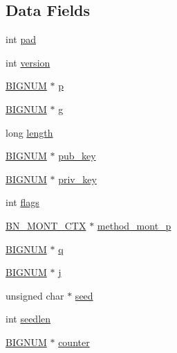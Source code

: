 \subsection*{Data Fields}
\begin{DoxyCompactItemize}
\item 
int \hyperlink{structdh__st_af1d40a330bc745f51d8b079c9dc473ff}{pad}
\item 
int \hyperlink{structdh__st_aad880fc4455c253781e8968f2239d56f}{version}
\item 
\hyperlink{crypto_2ossl__typ_8h_a6fb19728907ec6515e4bfb716bffa141}{B\+I\+G\+N\+UM} $\ast$ \hyperlink{structdh__st_ab39230b0a53cb4326ae76467247959c3}{p}
\item 
\hyperlink{crypto_2ossl__typ_8h_a6fb19728907ec6515e4bfb716bffa141}{B\+I\+G\+N\+UM} $\ast$ \hyperlink{structdh__st_a13fc89a0daf188f7de9a2011bc9b051f}{g}
\item 
long \hyperlink{structdh__st_ae2b29049fcd8b777a54a1529743b2390}{length}
\item 
\hyperlink{crypto_2ossl__typ_8h_a6fb19728907ec6515e4bfb716bffa141}{B\+I\+G\+N\+UM} $\ast$ \hyperlink{structdh__st_a7090145c3a15799f21c377097e2a1fd4}{pub\+\_\+key}
\item 
\hyperlink{crypto_2ossl__typ_8h_a6fb19728907ec6515e4bfb716bffa141}{B\+I\+G\+N\+UM} $\ast$ \hyperlink{structdh__st_a4f03319697f09215a51fd2d2439cffe9}{priv\+\_\+key}
\item 
int \hyperlink{structdh__st_ac8bf36fe0577cba66bccda3a6f7e80a4}{flags}
\item 
\hyperlink{crypto_2ossl__typ_8h_aec902d353e00ced6d3fee6cd033a8bd0}{B\+N\+\_\+\+M\+O\+N\+T\+\_\+\+C\+TX} $\ast$ \hyperlink{structdh__st_aca596b8cfa4cbd8719edf7a5d1f4cb62}{method\+\_\+mont\+\_\+p}
\item 
\hyperlink{crypto_2ossl__typ_8h_a6fb19728907ec6515e4bfb716bffa141}{B\+I\+G\+N\+UM} $\ast$ \hyperlink{structdh__st_aa8aedc93a12df9d36c9fe616c2b6486a}{q}
\item 
\hyperlink{crypto_2ossl__typ_8h_a6fb19728907ec6515e4bfb716bffa141}{B\+I\+G\+N\+UM} $\ast$ \hyperlink{structdh__st_a953fef8d0ad85d2258873133fd62cc68}{j}
\item 
unsigned char $\ast$ \hyperlink{structdh__st_aa2210dcd1c7bdfbd000f6a966adf86e8}{seed}
\item 
int \hyperlink{structdh__st_a8cae5e0a501d982b308a11163ac91a34}{seedlen}
\item 
\hyperlink{crypto_2ossl__typ_8h_a6fb19728907ec6515e4bfb716bffa141}{B\+I\+G\+N\+UM} $\ast$ \hyperlink{structdh__st_a1cf37e48d92f3521fcb5f681b749bea0}{counter}

\end{DoxyCompactItemize}
